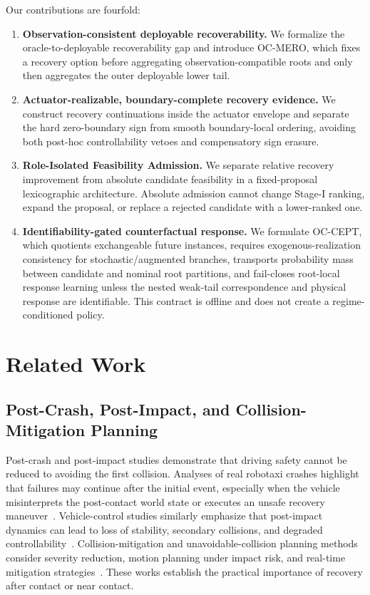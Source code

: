 \documentclass[conference]{IEEEtran}
\begin{document}
Our contributions are fourfold:
\begin{enumerate}[leftmargin=*]
    \item \textbf{Observation-consistent deployable recoverability.} We formalize the oracle-to-deployable recoverability gap and introduce OC-MERO, which fixes a recovery option before aggregating observation-compatible roots and only then aggregates the outer deployable lower tail.
    \item \textbf{Actuator-realizable, boundary-complete recovery evidence.} We construct recovery continuations inside the actuator envelope and separate the hard zero-boundary sign from smooth boundary-local ordering, avoiding both post-hoc controllability vetoes and compensatory sign erasure.
    \item \textbf{Role-Isolated Feasibility Admission.} We separate relative recovery improvement from absolute candidate feasibility in a fixed-proposal lexicographic architecture. Absolute admission cannot change Stage-I ranking, expand the proposal, or replace a rejected candidate with a lower-ranked one.
    \item \textbf{Identifiability-gated counterfactual response.} We formulate OC-CEPT, which quotients exchangeable future instances, requires exogenous-realization consistency for stochastic/augmented branches, transports probability mass between candidate and nominal root partitions, and fail-closes root-local response learning unless the nested weak-tail correspondence and physical response are identifiable. This contract is offline and does not create a regime-conditioned policy.
\end{enumerate}

\section{Related Work}

\subsection{Post-Crash, Post-Impact, and Collision-Mitigation Planning}

Post-crash and post-impact studies demonstrate that driving safety cannot be reduced to avoiding the first collision.  Analyses of real robotaxi crashes highlight that failures may continue after the initial event, especially when the vehicle misinterprets the post-contact world state or executes an unsafe recovery maneuver~\cite{koopman2024anatomy}.  Vehicle-control studies similarly emphasize that post-impact dynamics can lead to loss of stability, secondary collisions, and degraded controllability~\cite{wang2023integrated,parseh2023motion,wang2024post,yang2025post,ghosh2026post}.  Collision-mitigation and unavoidable-collision planning methods consider severity reduction, motion planning under impact risk, and real-time mitigation strategies~\cite{li2022vehicle,bosia2024real}.  These works establish the practical importance of recovery after contact or near contact.
\end{document}
